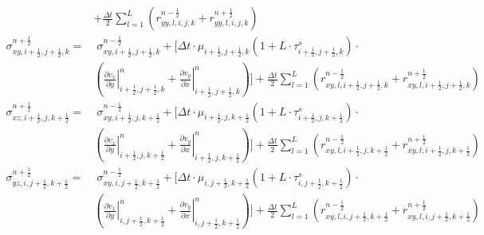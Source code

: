 \documentclass[pdftex,a4paper,parskip,listof=totoc,bibliography=totoc,onehalfspacing,12pt]{scrreprt}
\begin{document}
\begin{align*}
	&+ \frac{\Delta t}{2} \sum _{l=1}^{L} \left( r_{yy,l,i,j,k}^{n-\frac{1}{2}}+ r_{yy,l,i,j,k}^{n+\frac{1}{2}}\right)\\ 
	\sigma_{xy,i+\frac{1}{2},j+\frac{1}{2},k}^{n+\frac{1}{2}} =&\;\sigma_{xy,i+\frac{1}{2},j+\frac{1}{2},k}^{n-\frac{1}{2}}+\Bigg[\Delta t \cdot \mu_{i+\frac{1}{2},j+\frac{1}{2},k}\left(1+L\cdot\tau_{i+\frac{1}{2},j+\frac{1}{2},k}^s \right)\cdot \\ 
	&\left( \left.\frac{\partial v_x}{\partial y}\right\rvert_{i+\frac{1}{2},j+\frac{1}{2},k}^n + \left.\frac{\partial v_y}{\partial x}\right\rvert_{i+\frac{1}{2},j+\frac{1}{2},k}^n \right)\Bigg] + \frac{\Delta t}{2} \sum _{l=1}^{L} \left( r_{xy,l,i+\frac{1}{2},j+\frac{1}{2},k}^{n-\frac{1}{2}}+ r_{xy,l,i+\frac{1}{2},j+\frac{1}{2},k}^{n+\frac{1}{2}}\right) \\
	\sigma_{xz,i+\frac{1}{2},j,k+\frac{1}{2}}^{n+\frac{1}{2}} =&\;\sigma_{xy,i+\frac{1}{2},j,k+\frac{1}{2}}^{n-\frac{1}{2}}+\Bigg[\Delta t \cdot \mu_{i+\frac{1}{2},j,k+\frac{1}{2}}\left(1+L\cdot\tau_{i+\frac{1}{2},j,k+\frac{1}{2}}^s \right)\cdot \\ 
	&\left( \left.\frac{\partial v_x}{\partial y}\right\rvert_{i+\frac{1}{2},j,k+\frac{1}{2}}^n + \left.\frac{\partial v_y}{\partial x}\right\rvert_{i+\frac{1}{2},j,k+\frac{1}{2}}^n \right)\Bigg]  + \frac{\Delta t}{2} \sum _{l=1}^{L} \left( r_{xy,l,i+\frac{1}{2},j,k+\frac{1}{2}}^{n-\frac{1}{2}}+ r_{xy,l,i+\frac{1}{2},j,k+\frac{1}{2}}^{n+\frac{1}{2}}\right) \\
	\sigma_{yz,i,j+\frac{1}{2},k+\frac{1}{2}}^{n+\frac{1}{2}} =& \;\sigma_{xy,i,j+\frac{1}{2},k+\frac{1}{2}}^{n-\frac{1}{2}}+\Bigg[\Delta t \cdot \mu_{i,j+\frac{1}{2},k+\frac{1}{2}}\left(1+L\cdot\tau_{i,j+\frac{1}{2},k+\frac{1}{2}}^s \right)\cdot \\ 
	&\left( \left.\frac{\partial v_x}{\partial y}\right\rvert_{i,j+\frac{1}{2},k+\frac{1}{2}}^n + \left.\frac{\partial v_y}{\partial x}\right\rvert_{i,j+\frac{1}{2},k+\frac{1}{2}}^n \right)\Bigg]  + \frac{\Delta t}{2} \sum _{l=1}^{L} \left( r_{xy,l,i,j+\frac{1}{2},k+\frac{1}{2}}^{n-\frac{1}{2}}+ r_{xy,l,i,j+\frac{1}{2},k+\frac{1}{2}}^{n+\frac{1}{2}}\right) \\
\end{align*}
\end{document}
